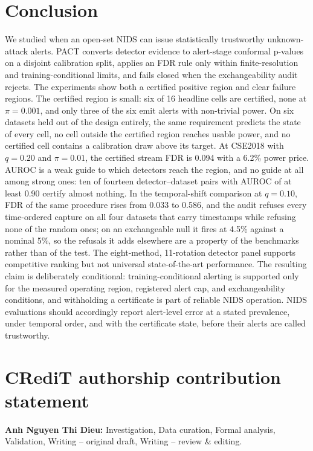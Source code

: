 \documentclass[a4paper,fleqn]{cas-dc}
\newcommand{\PACT}{PACT\xspace}
\begin{document}
\section{Conclusion}
\label{sec:conclusion}
We studied when an open-set NIDS can issue statistically trustworthy unknown-attack alerts. \PACT converts detector evidence to alert-stage conformal p-values on a disjoint calibration split, applies an FDR rule only within finite-resolution and training-conditional limits, and fails closed when the exchangeability audit rejects. The experiments show both a certified positive region and clear failure regions. The certified region is small: six of 16 headline cells are certified, none at $\pi=0.001$, and only three of the six emit alerts with non-trivial power. On six datasets held out of the design entirely, the same requirement predicts the state of every cell, no cell outside the certified region reaches usable power, and no certified cell contains a calibration draw above its target. At CSE2018 with $q=0.20$ and $\pi=0.01$, the certified stream FDR is 0.094 with a 6.2\% power price. AUROC is a weak guide to which detectors reach the region, and no guide at all among strong ones: ten of fourteen detector--dataset pairs with AUROC of at least 0.90 certify almost nothing. In the temporal-shift comparison at $q=0.10$, FDR of the same procedure rises from 0.033 to 0.586, and the audit refuses every time-ordered capture on all four datasets that carry timestamps while refusing none of the random ones; on an exchangeable null it fires at 4.5\% against a nominal 5\%, so the refusals it adds elsewhere are a property of the benchmarks rather than of the test. The eight-method, 11-rotation detector panel supports competitive ranking but not universal state-of-the-art performance. The resulting claim is deliberately conditional: training-conditional alerting is supported only for the measured operating region, registered alert cap, and exchangeability conditions, and withholding a certificate is part of reliable NIDS operation. NIDS evaluations should accordingly report alert-level error at a stated prevalence, under temporal order, and with the certificate state, before their alerts are called trustworthy.

\section*{CRediT authorship contribution statement}

\textbf{Anh Nguyen Thi Dieu:} Investigation, Data curation, Formal analysis, Validation, Writing -- original draft, Writing -- review \& editing.
\end{document}
